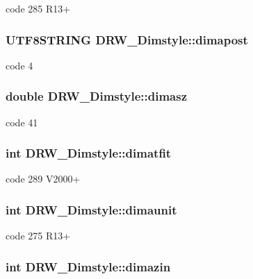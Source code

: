 code 285 R13+ \hypertarget{classDRW__Dimstyle_a933deca82de6d15d82ada90f8731a00b}{
\subsubsection[{dimapost}]{\setlength{\rightskip}{0pt plus 5cm}U\-T\-F8\-S\-T\-R\-I\-N\-G D\-R\-W\-\_\-\-Dimstyle\-::dimapost}}\label{classDRW__Dimstyle_a933deca82de6d15d82ada90f8731a00b}
code 4 \hypertarget{classDRW__Dimstyle_ae0ea0ac39cd2e961ccf4c3b54c570967}{
\subsubsection[{dimasz}]{\setlength{\rightskip}{0pt plus 5cm}double D\-R\-W\-\_\-\-Dimstyle\-::dimasz}}\label{classDRW__Dimstyle_ae0ea0ac39cd2e961ccf4c3b54c570967}
code 41 \hypertarget{classDRW__Dimstyle_a573b46a58131b108589f35bb67c9800f}{
\subsubsection[{dimatfit}]{\setlength{\rightskip}{0pt plus 5cm}int D\-R\-W\-\_\-\-Dimstyle\-::dimatfit}}\label{classDRW__Dimstyle_a573b46a58131b108589f35bb67c9800f}
code 289 V2000+ \hypertarget{classDRW__Dimstyle_a2f0ddeaf2ca3e3dc5a4e35c7fb509939}{
\subsubsection[{dimaunit}]{\setlength{\rightskip}{0pt plus 5cm}int D\-R\-W\-\_\-\-Dimstyle\-::dimaunit}}\label{classDRW__Dimstyle_a2f0ddeaf2ca3e3dc5a4e35c7fb509939}
code 275 R13+ \hypertarget{classDRW__Dimstyle_a5e3f7207c9924cd3f14b440f1db86f96}{
\subsubsection[{dimazin}]{\setlength{\rightskip}{0pt plus 5cm}int D\-R\-W\-\_\-\-Dimstyle\-::dimazin}}\label{classDRW__Dimstyle_a5e3f7207c9924cd3f14b440f1db86f96}
